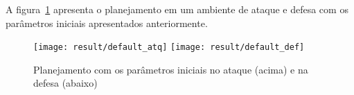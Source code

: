 A figura~\ref{fig:default} apresenta o planejamento em um
ambiente de ataque e defesa com os parâmetros iniciais
apresentados anteriormente.

\begin{figure}[H]
  \centering
  \texttt{[image: result/default\_atq]}
  \texttt{[image: result/default\_def]}
  \caption{Planejamento com os parâmetros iniciais no
           ataque (acima) e na defesa (abaixo)}\label{fig:default}
\end{figure}









